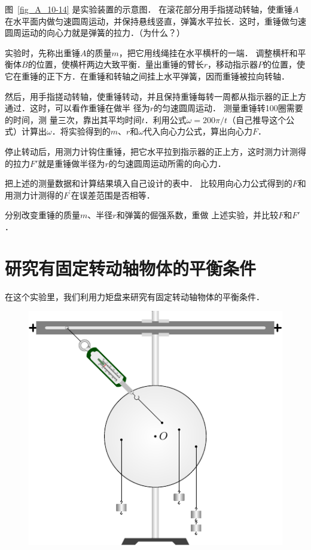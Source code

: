 图~\ref{fig_A_10-14} 是实验装置的示意图．
在滚花部分用手指搓动转轴，使重锤$A$在水平面内做匀速圆周运动，并保持悬线竖直，弹簧水平拉长．这时，重锤做匀速圆周运动的向心力就是弹簧的拉力．（为什么？）

实验时，先称出重锤$A$的质量$m$，把它用线绳挂在水平横杆的一端．
调整横杆和平衡体$B$的位置，使横杆两边大致平衡．量出重锤的臂长$r$，移动指示器$P$的位置，使它在重锤的正下方．在重锤和转轴之间挂上水平弹簧，因而重锤被拉向转轴．

然后，用手指搓动转轴，使重锤转动，并且保持重锤每转一周都从指示器的正上方通过．这时，可以看作重锤在做半
径为$r$的匀速圆周运动．
测量重锤转100圈需要的时间，测
量三次，靠出其平均时间$t$．利用公式$\omega=200\pi/t$（自己推导这个公式）计算出$\omega$．将实验得到的$m$、$r$和$\omega$代入向心力公式，算出向心力$F$．

停止转动后，用测力计钩住重锤，把它水平拉到指示器的正上方，这时测力计测得的拉力$F'$就是重锤做半径为$r$的匀速圆周运动所需的向心力．

把上述的测量数据和计算结果填入自己设计的表中．
比较用向心力公式得到的$F$和用测力计测得的$F^{\prime}$在误差范围是否相等．

分别改变重锤的质量$m$、半径$r$和弹簧的倔强系数，重做
上述实验，并比较$F$和$F'$．

\section{研究有固定转动轴物体的平衡条件}
在这个实验里，我们利用力矩盘来研究有固定转动轴物体的平衡条件．
\begin{figure}[htbp]
    \centering
    \includegraphics{fig/A/10-15.pdf}
    \caption{}\label{fig_A_10-15}
\end{figure}

